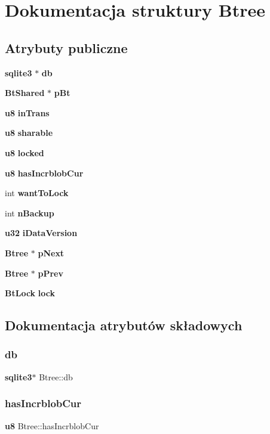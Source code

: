 \section{Dokumentacja struktury Btree}
\label{struct_btree}
\subsection*{Atrybuty publiczne}
\begin{DoxyCompactItemize}
\item 
\textbf{ sqlite3} $\ast$ \textbf{ db}
\item 
\textbf{ Bt\+Shared} $\ast$ \textbf{ p\+Bt}
\item 
\textbf{ u8} \textbf{ in\+Trans}
\item 
\textbf{ u8} \textbf{ sharable}
\item 
\textbf{ u8} \textbf{ locked}
\item 
\textbf{ u8} \textbf{ has\+Incrblob\+Cur}
\item 
int \textbf{ want\+To\+Lock}
\item 
int \textbf{ n\+Backup}
\item 
\textbf{ u32} \textbf{ i\+Data\+Version}
\item 
\textbf{ Btree} $\ast$ \textbf{ p\+Next}
\item 
\textbf{ Btree} $\ast$ \textbf{ p\+Prev}
\item 
\textbf{ Bt\+Lock} \textbf{ lock}
\end{DoxyCompactItemize}


\subsection{Dokumentacja atrybutów składowych}
\mbox{\label{struct_btree_a2b3cfec48b6e9fcfd641d433816ae5c3}} 
\subsubsection{db}
{\footnotesize\ttfamily \textbf{ sqlite3}$\ast$ Btree\+::db}

\mbox{\label{struct_btree_a247c6bd4123c5d53ebb96bd879047e25}} 
\subsubsection{hasIncrblobCur}
{\footnotesize\ttfamily \textbf{ u8} Btree\+::has\+Incrblob\+Cur}

